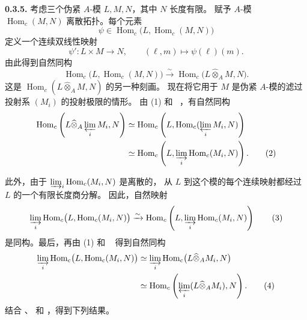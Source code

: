 
\medskip
\noindent\textbf{0.3.5.}
\label{sga3:VIIB:0.3.5}
考虑三个伪紧 \(A\)-模 \(L,M,N\)，其中 \(N\) 长度有限。
赋予 \(A\)-模 \(\operatorname{Hom}_c(M,N)\) 离散拓扑。每个元素
\[
  \psi\in
  \operatorname{Hom}_c
    \bigl(L,\operatorname{Hom}_c(M,N)\bigr)
\]
定义一个连续双线性映射
\[
  \psi':L\times M\longrightarrow N,
  \qquad
  (\ell,m)\longmapsto\psi(\ell)(m).
\]
由此得到自然同构
\begin{equation}
  \operatorname{Hom}_c
    \bigl(L,\operatorname{Hom}_c(M,N)\bigr)
  \xrightarrow{\sim}
  \operatorname{Hom}_c
    \bigl(L\widehat{\otimes}_A M,N\bigr).
  \tag{1}
  \label{sga3:VIIB:0.3.5-eq1}
\end{equation}
这是 \(\operatorname{Hom}_c(L\widehat{\otimes}_A M,N)\) 的另一种刻画。
现在将它用于 \(M\) 是伪紧 \(A\)-模的滤过投射系 \((M_i)\) 的投射极限的情形。
由 (1) 和 ~，有自然同构
\begin{align}
  \operatorname{Hom}_c
    \left(L\widehat{\otimes}_A\varprojlim_iM_i,N\right)
  &\simeq
  \operatorname{Hom}_c
    \left(L,\operatorname{Hom}_c(\varprojlim_iM_i,N)\right)
  \notag\\
  &\simeq
  \operatorname{Hom}_c
    \left(L,\varinjlim_i\operatorname{Hom}_c(M_i,N)\right).
  \tag{2}
  \label{sga3:VIIB:0.3.5-eq2}
\end{align}

此外，由于 \(\varinjlim_i\operatorname{Hom}_c(M_i,N)\) 是离散的，
从 \(L\) 到这个模的每个连续映射都经过 \(L\) 的一个有限长度商分解。
因此，自然映射
\begin{equation}
  \varinjlim_i
  \operatorname{Hom}_c
    \bigl(L,\operatorname{Hom}_c(M_i,N)\bigr)
  \xrightarrow{\sim}
  \operatorname{Hom}_c
    \left(L,\varinjlim_i\operatorname{Hom}_c(M_i,N)\right)
  \tag{3}
  \label{sga3:VIIB:0.3.5-eq3}
\end{equation}
是同构。最后，再由 (1) 和 ~ 得到自然同构
\begin{align}
  \varinjlim_i
  \operatorname{Hom}_c
    \bigl(L,\operatorname{Hom}_c(M_i,N)\bigr)
  &\simeq
  \varinjlim_i
  \operatorname{Hom}_c
    \bigl(L\widehat{\otimes}_A M_i,N\bigr)
  \notag\\
  &\simeq
  \operatorname{Hom}_c
    \left(\varprojlim_i
      (L\widehat{\otimes}_A M_i),N\right).
  \tag{4}
  \label{sga3:VIIB:0.3.5-eq4}
\end{align}
结合 、 和
，得到下列结果。

